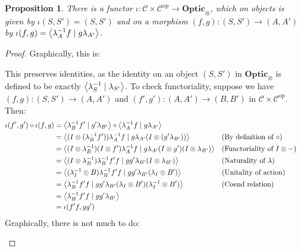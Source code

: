 \documentclass[11pt,letterpaper]{article}
\theoremstyle{plain}
\newtheorem{proposition}[theorem]{Proposition}
\theoremstyle{definition}
\newcommand{\C}{\mathscr{C}}
\newcommand{\Optic}{\mathbf{Optic}}
\newcommand{\op}{\mathrm{op}}
\newcommand{\rep}[2]{{\ensuremath \left\langle #1 \mid #2 \right\rangle}}
\begin{document}
\begin{proposition}\label{prop:iota-functor}
  There is a functor $\iota : \C \times \C^\op \to \Optic_\otimes$, which on objects is given by $\iota(S, S') = (S, S')$ and on a morphism $(f, g) : (S, S') \to (A, A')$ by $\iota(f, g) = \rep{\lambda_A^{-1} f}{g \lambda_{A'}}$.
\end{proposition}
\begin{proof}
  Graphically, this is:
  \begin{center}
    
  \end{center}

  This preserves identities, as the identity on an object $(S, S')$ in $\Optic_\otimes$ is defined to be exactly $\rep{\lambda^{-1}_S}{\lambda_{S'}}$. To check functoriality, suppose we have $(f, g) : (S, S') \to (A, A')$ and $(f', g') : (A, A') \to (B, B')$ in $\C \times \C^\op$. Then:
  \begin{align*}
    \iota(f', g') \circ \iota(f, g)
    &= \rep{\lambda^{-1}_B f'}{g' \lambda_{B'}} \circ \rep{\lambda^{-1}_A f}{g \lambda_{A'}} \\
    &= \rep{(I\otimes (\lambda^{-1}_B f'))\lambda^{-1}_A f}{g \lambda_{A'} (I\otimes (g' \lambda_{B'}))} && \text{(By definition of $\circ$)}\\
    &= \rep{(I \otimes \lambda^{-1}_B) (I \otimes f')\lambda^{-1}_A f}{g \lambda_{A'} (I \otimes g')(I\otimes \lambda_{B'})} && \text{(Functoriality of $I \otimes -$)}\\
    &= \rep{(I\otimes \lambda^{-1}_B) \lambda^{-1}_B f' f}{g g' \lambda_{B'} (I\otimes \lambda_{B'})} && \text{(Naturality of $\lambda$)}\\
    &= \rep{(\lambda^{-1}_I \otimes B) \lambda^{-1}_B f' f}{g g' \lambda_{B'} (\lambda_I \otimes B')} && \text{(Unitality of action)} \\
    &= \rep{\lambda^{-1}_B f' f}{g g' \lambda_{B'} (\lambda_I \otimes B') (\lambda^{-1}_I \otimes B')} && \text{(Coend relation)}  \\
    &= \rep{\lambda^{-1}_B f'f}{g g' \lambda_{B'}} \\
    &= \iota(f'f, gg')
  \end{align*}
  Graphically, there is not much to do:
  \begin{center}
    
    \qquad \raisebox{0.3cm}{$=$} \qquad
    
  \end{center}
\end{proof}
\end{document}
